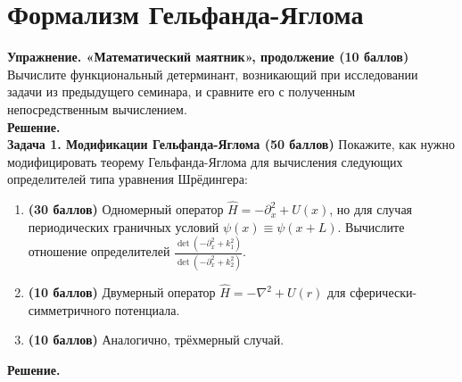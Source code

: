 \documentclass[12pt]{article}
\theoremstyle{definition}
\begin{document}
\section{Формализм Гельфанда-Яглома}
\textbf{Упражнение. «Математический маятник», продолжение (10 баллов)}\\
Вычислите функциональный детерминант, возникающий при исследовании задачи из предыдущего семинара, и сравните его с полученным непосредственным вычислением.\\
\textbf{Решение.}\\
\textbf{Задача 1. Модификации Гельфанда-Яглома (50 баллов)}
Покажите, как нужно модифицировать теорему Гельфанда-Яглома для вычисления следующих определителей типа уравнения Шрёдингера:
\begin{enumerate}
    \item\textbf{(30 баллов)} Одномерный оператор $\hat{H}=-\partial^2_x+U(x)$, но для случая периодических граничных условий $\psi(x)\equiv\psi(x + L)$. Вычислите отношение определителей $\frac{\det(-\partial^2_x+k^2_1)}{\det(-\partial^2_x+k^2_2)}$.
    \item\textbf{(10 баллов)} Двумерный оператор $\hat{H} =-\nabla^2 + U(r)$ для сферически-симметричного потенциала.
    \item\textbf{(10 баллов)} Аналогично, трёхмерный случай.
\end{enumerate}
\textbf{Решение.}
\end{document}
